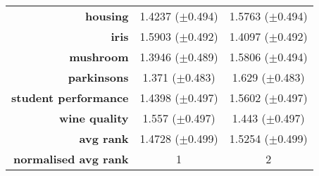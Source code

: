\begin{table}[htbp]
{\begin{tabular}{rcc}
			\multicolumn{1}{r|}{\textbf{housing}}             & \cellcolor[rgb]{ .388,  .745,  .482}1.4237 ($\pm$0.494)        & \cellcolor[rgb]{ .973,  .412,  .42}1.5763 ($\pm$0.494)  \\
			\multicolumn{1}{r|}{\textbf{iris}}                & \cellcolor[rgb]{ .973,  .412,  .42}1.5903 ($\pm$0.492)         & \cellcolor[rgb]{ .388,  .745,  .482}1.4097 ($\pm$0.492) \\
			\multicolumn{1}{r|}{\textbf{mushroom}}            & \cellcolor[rgb]{ .388,  .745,  .482}1.3946 ($\pm$0.489)        & \cellcolor[rgb]{ .973,  .412,  .42}1.5806 ($\pm$0.494)  \\
			\multicolumn{1}{r|}{\textbf{parkinsons}}          & \cellcolor[rgb]{ .388,  .745,  .482}1.371 ($\pm$0.483)         & \cellcolor[rgb]{ .973,  .412,  .42}1.629 ($\pm$0.483)   \\
			\multicolumn{1}{r|}{\textbf{student performance}} & \cellcolor[rgb]{ .388,  .745,  .482}1.4398 ($\pm$0.497)        & \cellcolor[rgb]{ .973,  .412,  .42}1.5602 ($\pm$0.497)  \\
			\multicolumn{1}{r|}{\textbf{wine quality}}        & \cellcolor[rgb]{ .973,  .412,  .42}1.557 ($\pm$0.497)          & \cellcolor[rgb]{ .388,  .745,  .482}1.443 ($\pm$0.497)  \\
			\midrule
			\multicolumn{1}{r|}{\textbf{avg rank}}            & \cellcolor[rgb]{ .388,  .745,  .482}1.4728 ($\pm$0.499)        & \cellcolor[rgb]{ .973,  .412,  .42}1.5254 ($\pm$0.499)  \\
			\midrule
			\textbf{normalised avg rank}                      & \cellcolor[rgb]{ .388,  .745,  .482}1                          & \cellcolor[rgb]{ .973,  .412,  .42}2                    \\
		\end{tabular}%

	}
\end{table}%


